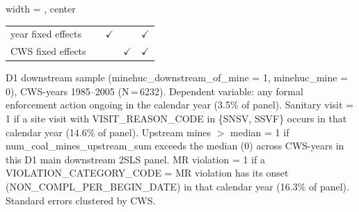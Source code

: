 \begin{table}[htbp]
\begin{adjustbox}{width = \textwidth, center}
\begin{tabular}{lcccc}
          \\
         
         year fixed effects        &                & $\checkmark$   &                 & $\checkmark$\\   
         CWS fixed effects         &                &                & $\checkmark$    & $\checkmark$\\   
         
         \bottomrule
         
      \end{tabular}
      
      
      
   \end{adjustbox}
      {\tiny\linespread{1}\selectfont \par \raggedright 
   D1 downstream sample (minehuc\_downstream\_of\_mine = 1, minehuc\_mine = 0), CWS-years 1985--2005 (N\,=\,6232). Dependent variable: any formal enforcement action ongoing in the calendar year (3.5\% of panel). Sanitary visit = 1 if a site visit with VISIT\_REASON\_CODE in \{SNSV, SSVF\} occurs in that calendar year (14.6\% of panel). Upstream mines $>$ median = 1 if num\_coal\_mines\_upstream\_sum exceeds the median (0) across CWS-years in this D1 main downstream 2SLS panel. MR violation = 1 if a VIOLATION\_CATEGORY\_CODE = MR violation has its onset (NON\_COMPL\_PER\_BEGIN\_DATE) in that calendar year (16.3\% of panel). Standard errors clustered by CWS.}
   
\end{table}


